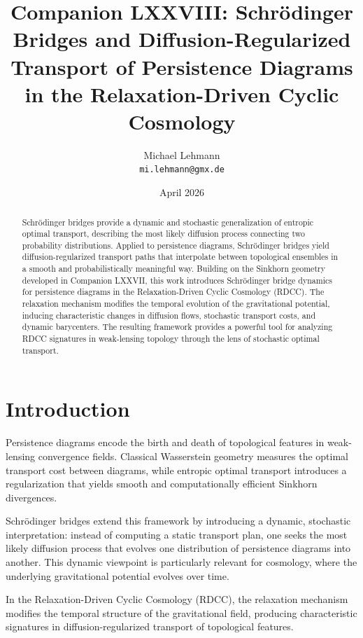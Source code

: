 \documentclass[11pt,a4paper]{article}
\title{\textbf{Companion LXXVIII: Schrödinger Bridges and Diffusion-Regularized Transport of Persistence Diagrams in the Relaxation-Driven Cyclic Cosmology}}
\author{Michael Lehmann \\ \texttt{mi.lehmann@gmx.de}}
\date{April 2026}
\begin{document}
\maketitle

\begin{abstract}
Schrödinger bridges provide a dynamic and stochastic generalization of entropic 
optimal transport, describing the most likely diffusion process connecting two 
probability distributions. Applied to persistence diagrams, Schrödinger bridges 
yield diffusion-regularized transport paths that interpolate between topological 
ensembles in a smooth and probabilistically meaningful way. Building on the 
Sinkhorn geometry developed in Companion LXXVII, this work introduces Schrödinger 
bridge dynamics for persistence diagrams in the Relaxation-Driven Cyclic Cosmology 
(RDCC). The relaxation mechanism modifies the temporal evolution of the 
gravitational potential, inducing characteristic changes in diffusion flows, 
stochastic transport costs, and dynamic barycenters. The resulting framework 
provides a powerful tool for analyzing RDCC signatures in weak-lensing topology 
through the lens of stochastic optimal transport.
\end{abstract}
\section{Introduction}

Persistence diagrams encode the birth and death of topological features in weak-
lensing convergence fields. Classical Wasserstein geometry measures the optimal 
transport cost between diagrams, while entropic optimal transport introduces a 
regularization that yields smooth and computationally efficient Sinkhorn 
divergences.

Schrödinger bridges extend this framework by introducing a dynamic, stochastic 
interpretation: instead of computing a static transport plan, one seeks the most 
likely diffusion process that evolves one distribution of persistence diagrams 
into another. This dynamic viewpoint is particularly relevant for cosmology, where 
the underlying gravitational potential evolves over time.

In the Relaxation-Driven Cyclic Cosmology (RDCC), the relaxation mechanism modifies 
the temporal structure of the gravitational field, producing characteristic 
signatures in diffusion-regularized transport of topological features.
\end{document}
